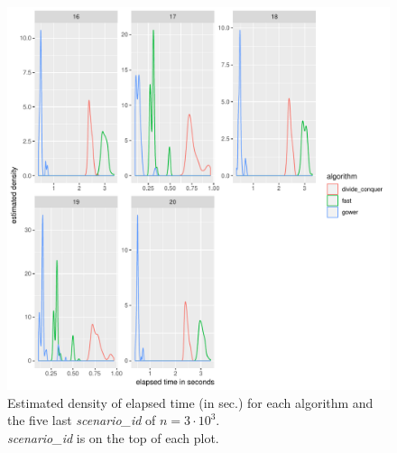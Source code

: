 \documentclass[11pt]{report}
\begin{document}
\begin{figure}[h]
\centering
    \includegraphics[scale=1]{./images/elapsed_time_3000_part2.pdf}
    \caption{
    Estimated density of elapsed time (in sec.) for each algorithm and the five 
    last \textit{scenario\_id} of $n=3 \cdot 10^3$.\\
    \textit{scenario\_id} is on the top of each plot.
    }
    \label{elapsed_time_3000}
\end{figure}

\FloatBarrier
\end{document}
